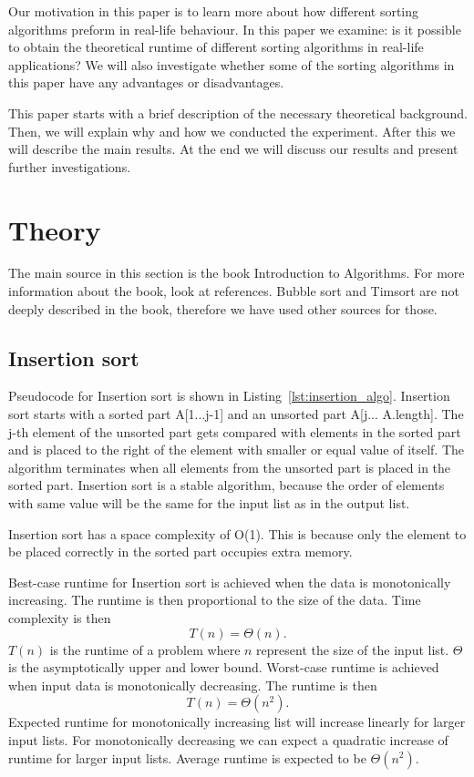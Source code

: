\documentclass[sigconf, nonacm, natbib, screen, balance=False]{acmart}
\begin{document}
Our motivation in this paper is to learn more about how different sorting algorithms preform in real-life behaviour. In this paper we examine: is it possible to obtain the theoretical runtime of different sorting algorithms in real-life applications? We will also investigate whether some of the sorting algorithms in this paper have any advantages or disadvantages.

This paper starts with a brief description of the necessary theoretical background. Then, we will explain why and how we conducted the experiment. After this we will describe the main results. At the end we will discuss our results and present further investigations. 

\section{Theory}\label{sec:theory}
The main source in this section is the book Introduction to Algorithms. For more information about the book, look at references. Bubble sort and Timsort are not deeply described in the book, therefore we have used other sources for those. 


\subsection{Insertion sort}\label{sec:algo1}
Pseudocode for Insertion sort is shown in Listing~\ref{lst:insertion_algo}. Insertion sort starts with a sorted part A[1...j-1] and an unsorted part A[j... A.length]. The j-th element of the unsorted part gets compared with elements in the sorted part and is placed to the right of the element with smaller or equal value of itself. The algorithm terminates when all elements from the unsorted part is placed in the sorted part. Insertion sort is a stable algorithm, because the order of elements with same value will be the same for the input list as in the output list. \citet{CLRS_2009} 

Insertion sort has a space complexity of O(1). This is because only the element to be placed correctly in the sorted part occupies extra memory. \citet{insertion_sort}

Best-case runtime for Insertion sort is achieved when the data is monotonically increasing. The runtime is then proportional to the size of the data. Time complexity is then 
\begin{equation*}
T(n) = \Theta(n). 
\end{equation*}
$T(n)$ is the runtime of a problem where $n$ represent the size of the input list. $\Theta$ is the asymptotically upper and lower bound. 
Worst-case runtime is achieved when input data is monotonically decreasing. The runtime is then 
\begin{equation*}
T(n) = \Theta(n^2).
\end{equation*}
Expected runtime for monotonically increasing list will increase linearly for larger input lists. For monotonically decreasing we can expect a quadratic increase of runtime for larger input lists. Average runtime is expected to be $\Theta(n^2)$. \citet{CLRS_2009}
 
\end{document}
